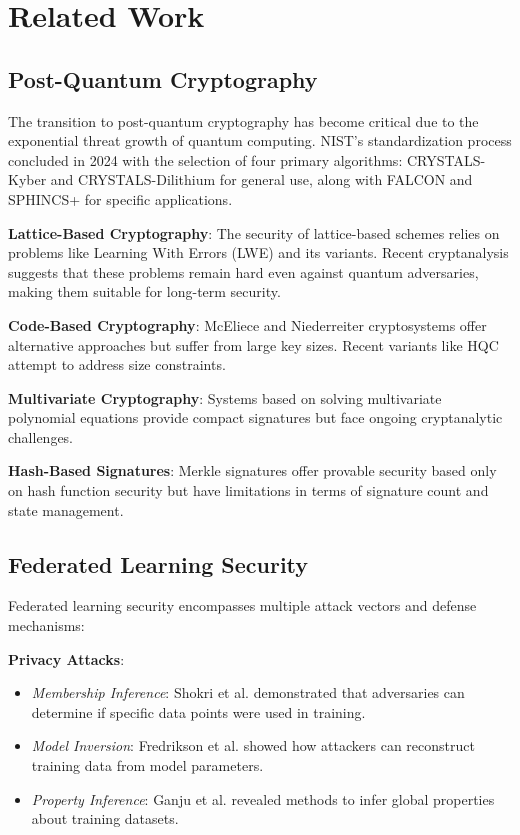 \documentclass[journal,onecolumn,draftclsnofoot]{IEEEtran}
\begin{document}
\section{Related Work}

\subsection{Post-Quantum Cryptography}

The transition to post-quantum cryptography has become critical due to the exponential threat growth of quantum computing. NIST's standardization process \cite{nist2022pqc} concluded in 2024 with the selection of four primary algorithms: CRYSTALS-Kyber \cite{bos2018crystals} and CRYSTALS-Dilithium \cite{ducas2018crystals} for general use, along with FALCON and SPHINCS+ for specific applications.

\textbf{Lattice-Based Cryptography}: The security of lattice-based schemes relies on problems like Learning With Errors (LWE) \cite{regev2005lwe} and its variants. Recent cryptanalysis \cite{albrecht2017estimate} suggests that these problems remain hard even against quantum adversaries, making them suitable for long-term security.

\textbf{Code-Based Cryptography}: McEliece and Niederreiter cryptosystems \cite{mceliece1978public} offer alternative approaches but suffer from large key sizes. Recent variants like HQC \cite{melchor2018hqc} attempt to address size constraints.

\textbf{Multivariate Cryptography}: Systems based on solving multivariate polynomial equations \cite{ding2006rainbow} provide compact signatures but face ongoing cryptanalytic challenges.

\textbf{Hash-Based Signatures}: Merkle signatures \cite{merkle1989certified} offer provable security based only on hash function security but have limitations in terms of signature count and state management.

\subsection{Federated Learning Security}

Federated learning security encompasses multiple attack vectors and defense mechanisms:

\textbf{Privacy Attacks}: 
\begin{itemize}
\item \textit{Membership Inference}: Shokri et al. \cite{shokri2017membership} demonstrated that adversaries can determine if specific data points were used in training.
\item \textit{Model Inversion}: Fredrikson et al. \cite{fredrikson2015model} showed how attackers can reconstruct training data from model parameters.
\item \textit{Property Inference}: Ganju et al. \cite{ganju2018property} revealed methods to infer global properties about training datasets.
\end{itemize}
\end{document}
